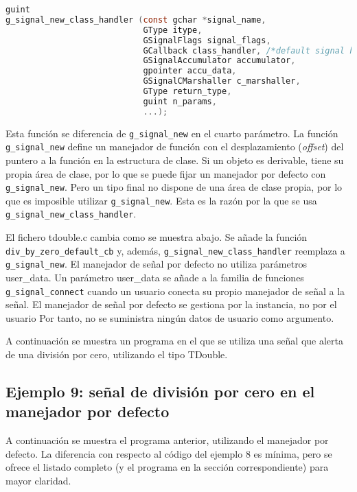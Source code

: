 \begin{lstlisting}[language=C, numbers=none]
guint
g_signal_new_class_handler (const gchar *signal_name,
                            GType itype,
                            GSignalFlags signal_flags,
                            GCallback class_handler, /*default signal handler */
                            GSignalAccumulator accumulator,
                            gpointer accu_data,
                            GSignalCMarshaller c_marshaller,
                            GType return_type,
                            guint n_params,
                            ...);
\end{lstlisting}

Esta función se diferencia de \texttt{g\_signal\_new} en el cuarto parámetro.
La función \texttt{g\_signal\_new} define un manejador de función con el desplazamiento (\emph{offset}) del puntero a la función en la estructura de clase. Si un objeto es derivable, tiene su propia área de clase, por lo que se puede fijar un manejador por defecto con \texttt{g\_signal\_new}. Pero un tipo final no dispone de una área de clase propia, por lo que es imposible utilizar \texttt{g\_signal\_new}. Esta es la razón por la que se usa \texttt{g\_signal\_new\_class\_handler}.

El fichero \textsf{tdouble.c} cambia como se muestra abajo. Se añade la función
\texttt{div\_by\_zero\_default\_cb} y, además, \texttt{g\_signal\_new\_class\_handler} reemplaza a \texttt{g\_signal\_new}. El manejador de señal por defecto no utiliza parámetros \textsf{user\_data}.
Un parámetro \textsf{user\_data} se añade a la familia de funciones \texttt{g\_signal\_connect} cuando un usuario conecta su propio manejador de señal a la señal. El manejador de señal por defecto se gestiona por la instancia, no por el usuario Por tanto, no se suministra ningún datos de usuario como argumento.

A continuación se muestra un programa en el que se utiliza una señal que alerta de una división por cero, utilizando el tipo \textsf{TDouble}.

\subsection{Ejemplo 9: señal de división por cero en el manejador por defecto}
A continuación se muestra el programa anterior, utilizando el manejador por defecto.
La diferencia con respecto al código del ejemplo 8 es mínima, pero se ofrece el listado
completo (y el programa en la sección correspondiente) para mayor claridad.

